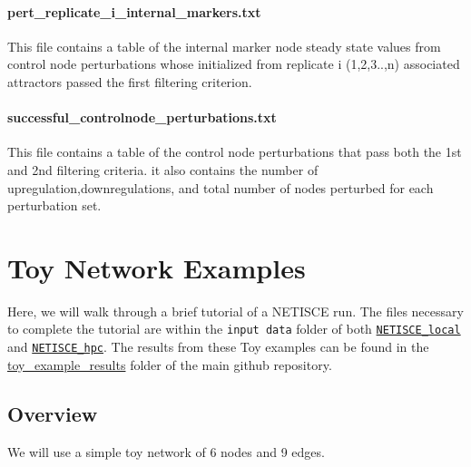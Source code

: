 \documentclass[
]{book}
\begin{document}
\hypertarget{section-id}{%
\subsubsection*{pert\_replicate\_i\_internal\_markers.txt}\label{section-id}}

This file contains a table of the internal marker node steady state values from control node perturbations whose initialized from replicate i (1,2,3..,n) associated attractors passed the first filtering criterion.

\hypertarget{section-id}{%
\subsubsection*{successful\_controlnode\_perturbations.txt}\label{section-id}}

This file contains a table of the control node perturbations that pass both the 1st and 2nd filtering criteria. it also contains the number of upregulation,downregulations, and total number of nodes perturbed for each perturbation set.

\hypertarget{toy}{%
\chapter{Toy Network Examples}\label{toy}}

Here, we will walk through a brief tutorial of a NETISCE run. The files necessary to complete the tutorial are within the \texttt{input\ data} folder of both \href{https://github.com/VeraLiconaResearchGroup/Netisce/tree/main/NETISCE_local}{\texttt{NETISCE\_local}} and \href{https://github.com/VeraLiconaResearchGroup/Netisce/tree/main/NETISCE_hpc}{\texttt{NETISCE\_hpc}}.
The results from these Toy examples can be found in the \href{https://github.com/VeraLiconaResearchGroup/Netisce/tree/main/toy_example_results}{toy\_example\_results} folder of the main github repository.

\hypertarget{overview}{%
\section{Overview}\label{overview}}

We will use a simple toy network of 6 nodes and 9 edges.
\end{document}

